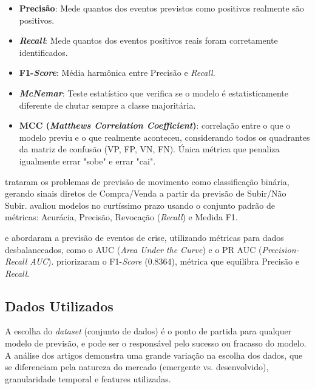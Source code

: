 \begin{itemize}
    \begin{itemize}
        \item \textbf{Precisão}: Mede quantos dos eventos previstos como positivos realmente são positivos.
        \item \textbf{\textit{Recall}}: Mede quantos dos eventos positivos reais foram corretamente identificados.
        \item \textbf{F1-\textit{Score}}: Média harmônica entre Precisão e \textit{Recall}.
        \item \textbf{\textit{McNemar}}: Teste estatístico que verifica se o modelo é estatisticamente diferente de chutar sempre a classe majoritária.
        \item \textbf{MCC (\textit{Matthews Correlation Coefficient})}: correlação entre o que o modelo previu e o que realmente aconteceu, considerando todos os quadrantes da matriz de confusão (VP, FP, VN, FN). Única métrica que penaliza igualmente errar "sobe" e errar "cai".
    \end{itemize}

     trataram os problemas de previsão de movimento como classificação binária, gerando sinais diretos de Compra/Venda a partir da previsão de Subir/Não Subir.  avaliou modelos no curtíssimo prazo usando o conjunto padrão de métricas: Acurácia, Precisão, Revocação (\textit{Recall}) e Medida F1.

     e  abordaram a previsão de eventos de crise, utilizando métricas para dados desbalanceados, como o AUC (\textit{Area Under the Curve}) e o PR AUC (\textit{Precision-Recall AUC}).  priorizaram o F1-\textit{Score} (0.8364), métrica que equilibra Precisão e \textit{Recall}.
    
\end{itemize}

\subsection{Dados Utilizados}

A escolha do \textit{dataset} (conjunto de dados) é o ponto de partida para qualquer modelo de previsão, e pode ser o responsável pelo sucesso ou fracasso do modelo. A análise dos artigos demonstra uma grande variação na escolha dos dados, que se diferenciam pela natureza do mercado (emergente vs. desenvolvido), granularidade temporal e features utilizadas.

